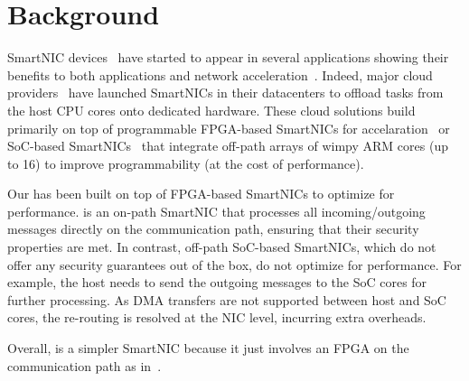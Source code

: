 





\section{Background} 



SmartNIC devices~\cite{liquidIO_smartnics, u280_smartnics, bluefield_smartnics, broadcom_smartnics, netronome_smartnics, alibaba_smartnics, nitro_smartnics, msr_smartnics} have started to appear in several applications showing their benefits to both applications and network acceleration~\cite{211249, 10.1145/3341302.3342079}. Indeed, major cloud providers~\cite{alibaba_smartnics, nitro_smartnics, msr_smartnics} have launched SmartNICs in their datacenters to offload tasks from the host CPU cores onto dedicated hardware.
These cloud solutions build primarily on top of programmable FPGA-based SmartNICs for accelaration~\cite{msr_smartnics} or SoC-based SmartNICs~\cite{bluefield_smartnics} that integrate off-path arrays of wimpy ARM cores (up to 16) to improve programmability (at the cost of performance).

Our \trustednic{} has been built on top of FPGA-based SmartNICs to optimize for performance. \trustednic{} is an on-path SmartNIC that processes all incoming/outgoing messages directly on the communication path, ensuring that their security properties are met. In contrast, off-path SoC-based SmartNICs, which do not offer any security guarantees out of the box, do not optimize for performance. For example, the host needs to send the outgoing messages to the SoC cores for further processing. As DMA transfers are not supported between host and SoC cores, the re-routing is resolved at the NIC level, incurring extra overheads.

Overall, \trustednic{} is a simpler SmartNIC because it just involves an FPGA on the communication path as in~\cite{msr_smartnics}. %
